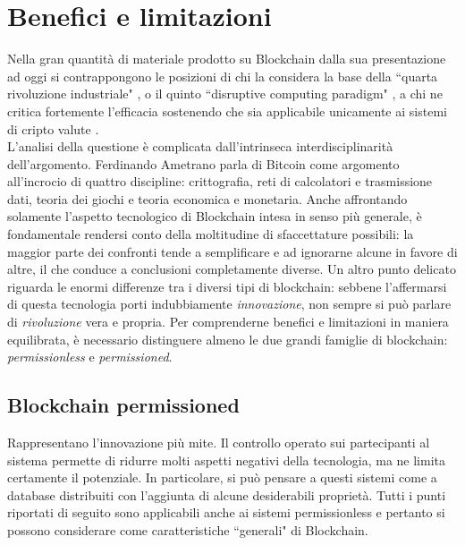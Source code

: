 \section{Benefici e limitazioni}
	Nella gran quantità di materiale prodotto su Blockchain dalla sua presentazione ad oggi si contrappongono le posizioni di chi la considera la base della ``quarta rivoluzione industriale" \cite{4industrialrevo}, o il quinto ``disruptive computing paradigm" \cite{blockchain_swan}, a chi ne critica fortemente l'efficacia sostenendo che sia applicabile unicamente ai sistemi di cripto valute \cite{what_is_it_good_for}. \\
	L'analisi della questione è complicata dall'intrinseca interdisciplinarità dell'argomento. Ferdinando Ametrano parla di Bitcoin \cite{Ametrano_slides} come argomento all'incrocio di quattro discipline: crittografia, reti di calcolatori e trasmissione dati, teoria dei giochi e teoria economica e monetaria. Anche affrontando solamente l'aspetto tecnologico di Blockchain intesa in senso più generale, è fondamentale rendersi conto della moltitudine di sfaccettature possibili: la maggior parte dei confronti tende a semplificare e ad ignorarne alcune in favore di altre, il che conduce a conclusioni completamente diverse. Un altro punto delicato riguarda le enormi differenze tra i diversi tipi di blockchain: sebbene l'affermarsi di questa tecnologia porti indubbiamente \emph{innovazione}, non sempre si può parlare di \emph{rivoluzione} vera e propria. Per comprenderne benefici e limitazioni in maniera equilibrata, è necessario distinguere almeno le due grandi famiglie di blockchain: \emph{permissionless} e \emph{permissioned}.
	\subsection{Blockchain permissioned}
		Rappresentano l'innovazione più mite. Il controllo operato sui partecipanti al sistema permette di ridurre molti aspetti negativi della tecnologia, ma ne limita certamente il potenziale. In particolare, si può pensare a questi sistemi come a database distribuiti con l'aggiunta di alcune desiderabili proprietà. Tutti i punti riportati di seguito sono applicabili anche ai sistemi permissionless e pertanto si possono considerare come caratteristiche ``generali" di Blockchain.
